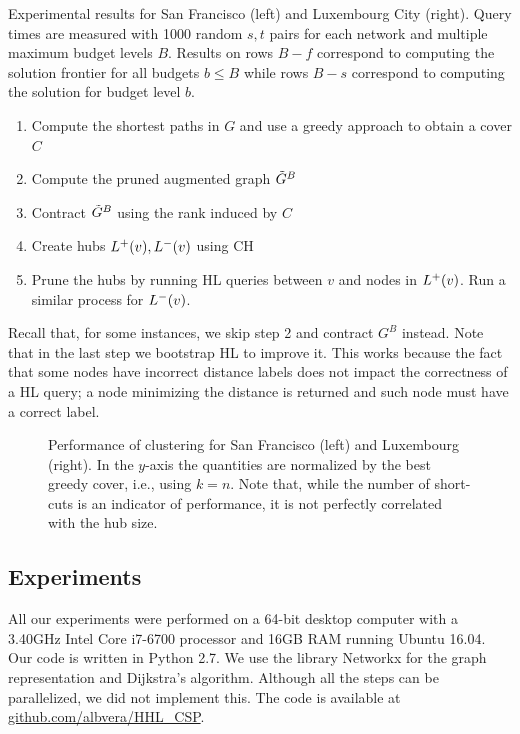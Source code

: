 \begin{table}
\caption{Experimental results for San Francisco (left) and Luxembourg City (right). Query times are measured with 1000 random $s,t$ pairs for each network and multiple maximum budget levels $B$. Results on rows $B-f$ correspond to computing the solution frontier for all budgets $b\leq B$ while rows $B-s$ correspond to computing the solution for budget level $b$.}
\label{tab:performance_results}
\end{table}


\begin{enumerate}[nosep]
\item Compute the shortest paths in $G$ and use a greedy approach to obtain a cover $C$
\item Compute the pruned augmented graph $\tilde G^B$
\item Contract $\tilde G^B$ using the rank induced by $C$
\item Create hubs $L^+(v),L^-(v)$ using CH
\item Prune the hubs by running HL queries between $v$ and nodes in $L^+(v)$. 
Run a similar process for $L^-(v)$.
\end{enumerate}
Recall that, for some instances, we skip step 2 and contract $G^B$ instead.
Note that in the last step we bootstrap HL to improve it.
This works because the fact that some nodes have incorrect distance labels does not impact the correctness of a HL query; a node minimizing the distance is returned and such node must have a correct label.

\begin{figure}
\caption{Performance of clustering for San Francisco (left) and Luxembourg (right). 
In the $y$-axis the quantities are normalized by the best greedy cover, i.e., using $k=n$.
Note that, while the number of short-cuts is an indicator of performance, it is not perfectly correlated with the hub size.}
\label{fig:clusters}
\end{figure}


\subsection{Experiments} \label{sec:exp}
All our experiments were performed on a 64-bit desktop computer with a 3.40GHz Intel Core i7-6700 processor and 16GB RAM running Ubuntu 16.04.
Our code is written in Python 2.7.
We use the library Networkx for the graph representation and Dijkstra's algorithm.
Although all the steps can be parallelized, we did not implement this.
The code is available at \url{github.com/albvera/HHL_CSP}.

